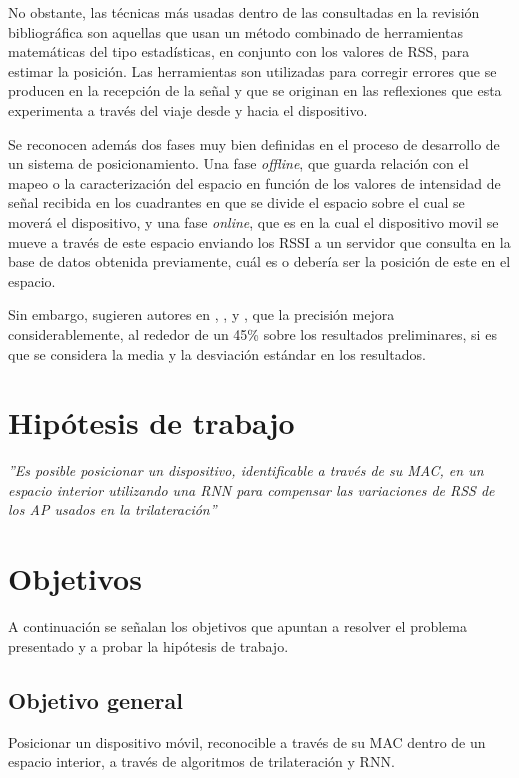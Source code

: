 No obstante, las técnicas más usadas dentro de las consultadas en la revisión bibliográfica son aquellas que usan un método combinado de herramientas matemáticas del tipo estadísticas, en conjunto con los valores de RSS, para estimar la posición. Las herramientas son utilizadas para corregir errores que se producen en la recepción de la señal y que se originan en las reflexiones que esta experimenta a través del viaje desde y hacia el dispositivo.

Se reconocen además dos fases muy bien definidas en el proceso de desarrollo de un sistema de posicionamiento. Una fase \textit{offline}, que guarda relación con el mapeo o la caracterización del espacio en función de los valores de intensidad de señal recibida en los cuadrantes en que se divide el espacio sobre el cual se moverá el dispositivo, y una fase \textit{online}, que es en la cual el dispositivo movil se mueve a través de este espacio enviando los RSSI a un servidor que consulta en la base de datos obtenida previamente, cuál es o debería ser la posición de este en el espacio.

Sin embargo, sugieren autores en \cite{8}, \cite{11}, \cite{12} y \cite{14}, que la precisión mejora considerablemente, al rededor de un 45\% sobre los resultados preliminares, si es que se considera la media y la desviación estándar en los resultados.



\section{Hipótesis de trabajo}
\begin{center}
\textit{''Es posible posicionar un dispositivo, identificable a través de su MAC, en un espacio interior utilizando una \ac{RNN} para compensar las variaciones de RSS de los \ac{AP} usados en la trilateración''}
\end{center}

\section{Objetivos}
A continuación se señalan los objetivos que apuntan a resolver el problema presentado y a probar la hipótesis de trabajo.

\subsection{Objetivo general}
Posicionar un dispositivo móvil, reconocible a través de su \ac{MAC} dentro de un espacio interior, a través de algoritmos de trilateración y \ac{RNN}.

